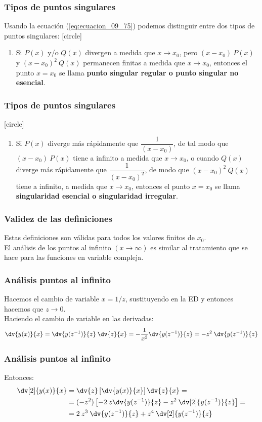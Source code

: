 \begin{frame}
\frametitle{Tipos de puntos singulares}
Usando la ecuación (\ref{eq:ecuacion_09_75}) podemos distinguir entre dos tipos de puntos singulares:
[circle]
\begin{enumerate}
\item Si $P(x)$ y/o $Q(x)$ divergen a medida que $x \to x_{0}$, pero $(x - x_{0}) \: P(x)$ y $(x - x_{0})^{2} \: Q(x)$ permanecen finitas a medida que $x \to x_{0}$, entonces el punto $x = x_{0}$ se llama \textbf{punto singular regular o punto singular no esencial}.
\seti
\end{enumerate}
\end{frame}
\begin{frame}
\frametitle{Tipos de puntos singulares}
[circle]
\begin{enumerate}
\conti 
\item Si $P(x)$ diverge más rápidamente que $\dfrac{1}{(x - x_{0})}$, de tal modo que $(x - x_{0}) \: P(x)$ tiene a infinito a medida que $x \to x_{0}$, o cuando $Q(x)$ diverge más rápidamente que $\dfrac{1}{(x - x_{0})^{2}}$, de modo que $(x - x_{0})^{2} \: Q(x)$ tiene a infinito, a medida que $x \to x_{0}$, entonces el punto $x = x_{0}$ se llama \textbf{singularidad esencial o singularidad irregular}.
\end{enumerate}
\end{frame}
\begin{frame}
\frametitle{Validez de las definiciones}
Estas definiciones son válidas para todos los valores finitos de $x_{0}$. 
\\
\bigskip
El análisis de los puntos al infinito $(x \to \infty)$ es similar al tratamiento que se hace para las funciones en variable compleja.
\end{frame}
\begin{frame}
\frametitle{Análisis puntos al infinito}
Hacemos el cambio de variable $x = 1/z$, sustituyendo en la ED y entonces hacemos que $z \to 0$. 
\\
\bigskip
Haciendo el cambio de variable en las derivadas:
\begin{align}
\dv{y(x)}{x} = \dv{y(z^{-1})}{z} \: \dv{z}{x} = - \dfrac{1}{x^{2}} \dv{y(z^{-1})}{z} = -z^{2} \: \dv{y(z^{-1})}{z}
\label{eq:ecuacion_09_76}
\end{align}
\end{frame}
\begin{frame}
\frametitle{Análisis puntos al infinito}
Entonces:
\begin{align}
\begin{aligned}
\dv[2]{y(x)}{x} &= \dv{z} \left[ \dv{y(x)}{x} \right] \dv{z}{x} = \\
&= (-z^{2}) \left[ -2 \: z \dv{y(z^{-1})}{z} - z^{2} \: \dv[2]{y(z^{-1})}{z} \right] = \\
&= 2 \: z^{3} \: \dv{y(z^{-1})}{z} + z^{4} \: \dv[2]{y(z^{-1})}{z}
\end{aligned}
\label{eq:ecuacion_09_77}
\end{align}
\end{frame}
